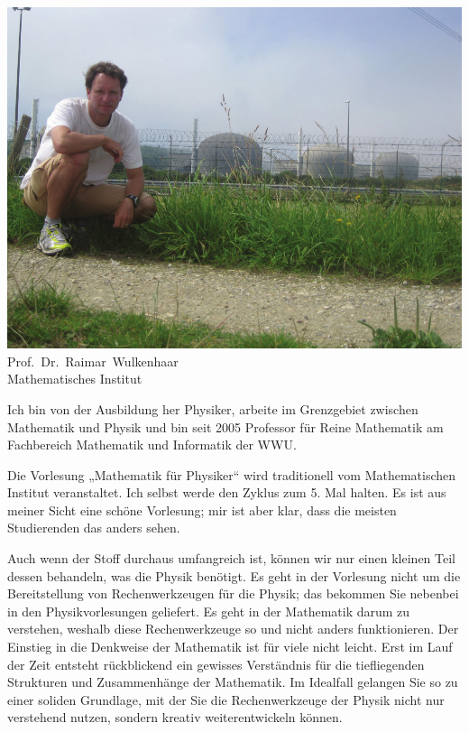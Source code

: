 \begin{multicols}{2}
\begin{center}
\includegraphics[width=0.9\columnwidth]{res/vorstellungsfotos/wulkenhaar.png}\\
Prof.\ Dr.\ Raimar\ Wulkenhaar\\
Mathematisches Institut
\end{center}

Ich bin von der Ausbildung her Physiker, arbeite im Grenzgebiet zwischen Mathematik und Physik und bin seit 2005 Professor für Reine Mathematik am Fachbereich Mathematik und Informatik der WWU.

Die Vorlesung „Mathematik für Physiker“ wird traditionell vom Mathematischen Institut veranstaltet. Ich selbst werde den Zyklus zum 5. Mal halten. Es ist aus meiner Sicht eine schöne Vorlesung; mir ist aber klar, dass die meisten Studierenden das anders sehen.

Auch wenn der Stoff durchaus umfangreich ist, können wir nur einen kleinen Teil dessen behandeln, was die Physik benötigt. Es geht in der Vorlesung nicht um die Bereitstellung von Rechenwerkzeugen für die Physik; das bekommen Sie nebenbei in den Physikvorlesungen geliefert. Es geht in der Mathematik darum zu verstehen, weshalb diese Rechenwerkzeuge so und nicht anders funktionieren. Der Einstieg in die Denkweise der Mathematik ist für viele nicht leicht. Erst im Lauf der Zeit entsteht rückblickend ein gewisses Verständnis für die tiefliegenden Strukturen und Zusammenhänge der Mathematik. Im Idealfall gelangen Sie so zu einer soliden Grundlage, mit der Sie die Rechenwerkzeuge der Physik nicht nur verstehend nutzen, sondern kreativ weiterentwickeln können.



\end{multicols}
